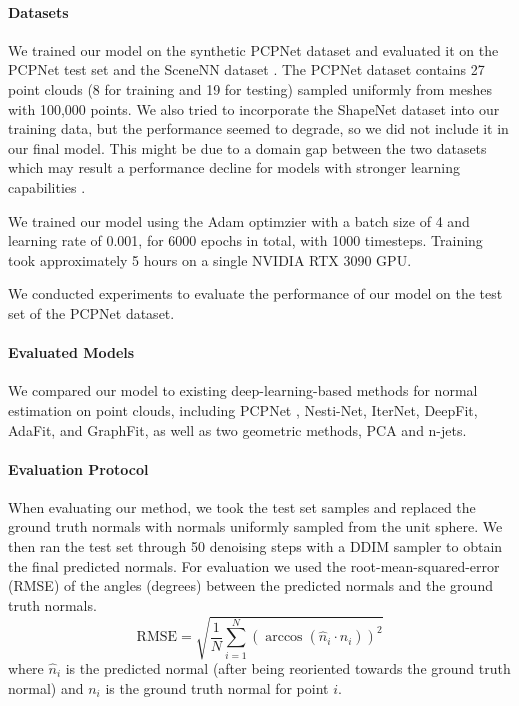 \documentclass{acmart}
\begin{document}
\paragraph{Datasets}
We trained our model on the synthetic PCPNet dataset \cite{guerrero2018pcpnet} and evaluated it on the PCPNet test set and the SceneNN dataset \cite{scenenn-3dv16}. The PCPNet dataset contains 27 point clouds (8 for training and 19 for testing) sampled uniformly from meshes with 100,000 points. We also tried to incorporate the ShapeNet dataset \cite{chang2015shapenet} into our training data, but the performance seemed to degrade, so we did not include it in our final model. This might be due to a domain gap between the two datasets which may result a performance decline for models with stronger learning capabilities \cite{arXiv:2406.09681}.

We trained our model using the Adam optimzier with a batch size of 4 and learning rate of 0.001, for 6000 epochs in total, with 1000 timesteps. Training took approximately 5 hours on a single NVIDIA RTX 3090 GPU.

We conducted experiments to evaluate the performance of our model on the test set of the PCPNet dataset.

\paragraph{Evaluated Models}
We compared our model to existing deep-learning-based methods for normal estimation on point clouds, including PCPNet \cite{guerrero2018pcpnet}, Nesti-Net, IterNet, DeepFit, AdaFit, and GraphFit, as well as two geometric methods, PCA and n-jets.
\paragraph{Evaluation Protocol}
When evaluating our method, we took the test set samples and replaced the ground truth normals with normals uniformly sampled from the unit sphere. We then ran the test set through 50 denoising steps with a DDIM sampler to obtain the final predicted normals.
For evaluation we used the root-mean-squared-error (RMSE) of the angles (degrees) between the predicted normals and the ground truth normals.
\begin{equation}
    \text{RMSE} = \sqrt{\frac{1}{N}\sum_{i=1}^{N}(\arccos(\hat{n}_i \cdot n_i))^2}
\end{equation}
where $\hat{n}_i$ is the predicted normal (after being reoriented towards the ground truth normal) and $n_i$ is the ground truth normal for point $i$.
\end{document}
